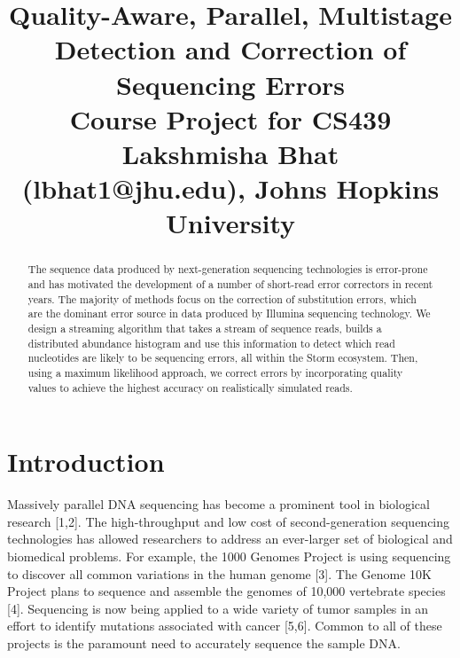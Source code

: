 \documentclass[11pt]{article}
\title{Quality-Aware, Parallel, Multistage Detection and Correction of Sequencing Errors \\ Course Project for CS439 \\ Lakshmisha Bhat (lbhat1@jhu.edu), Johns Hopkins University}
\begin{document}
\large
\date{}
\maketitle
\vspace{-.5in}

\begin{abstract}
The sequence data produced by next-generation sequencing technologies is error-prone and has motivated the development of a number of short-read error correctors in recent years. The majority of methods focus on the correction of substitution errors, which are the dominant error source in data produced by Illumina sequencing technology. We design a streaming algorithm that takes a stream of sequence reads, builds a distributed abundance histogram and use this information to detect which read nucleotides are likely to be sequencing errors, all within the Storm ecosystem. Then, using a maximum likelihood approach, we correct errors by incorporating quality values to achieve the highest accuracy on realistically simulated reads.\\
\end{abstract}

\section{Introduction}
Massively parallel DNA sequencing has become a prominent tool in biological research [1,2]. The high-throughput and low cost of second-generation sequencing technologies has allowed researchers to address an ever-larger set of biological and biomedical problems. For example, the 1000 Genomes Project is using sequencing to discover all common variations in the human genome [3]. The Genome 10K Project plans to sequence and assemble the genomes of 10,000 vertebrate species [4]. Sequencing is now being applied to a wide variety of tumor samples in an effort to identify mutations associated with cancer [5,6]. Common to all of these projects is the paramount need to accurately sequence the sample DNA.
\end{document}
